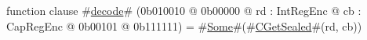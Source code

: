 function clause #\hyperref[zdecode]{decode}# (0b010010 @ 0b00000 @ rd : IntRegEnc @ cb : CapRegEnc @    0b00101 @ 0b111111) = #\hyperref[zSome]{Some}#(#\hyperref[zCGetSealed]{CGetSealed}#(rd, cb))

